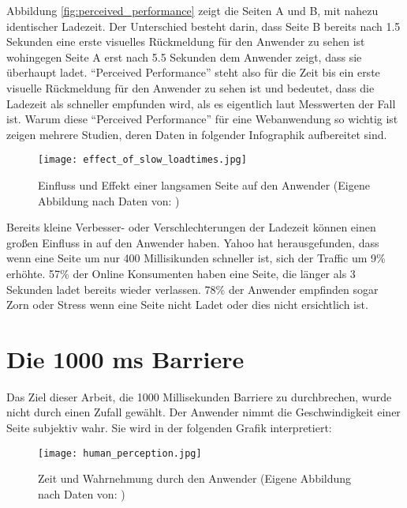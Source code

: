 		Abbildung \ref{fig:perceived_performance} zeigt die Seiten A und B, mit nahezu identischer Ladezeit. Der Unterschied besteht darin, dass Seite B bereits nach 1.5 Sekunden eine erste visuelles Rückmeldung für den Anwender zu sehen ist wohingegen Seite A erst nach 5.5 Sekunden dem Anwender zeigt, dass sie überhaupt ladet.
		"`Perceived Performance"' steht also für die Zeit bis ein erste visuelle Rückmeldung für den Anwender zu sehen ist und bedeutet, dass die Ladezeit als schneller empfunden wird, als es eigentlich laut Messwerten der Fall ist. Warum diese "`Perceived Performance"' für eine Webanwendung so wichtig ist zeigen mehrere Studien, deren Daten in folgender Infographik aufbereitet sind.

		\begin{figure}[htbp]
			\begin{center}
				\texttt{[image: effect\_of\_slow\_loadtimes.jpg]}
				\caption{Einfluss und Effekt einer langsamen Seite auf den Anwender (Eigene Abbildung nach Daten von: \autocite[p. 8]{radware14})}
				\label{fig:effect_of_slow_loadtimes}
			\end{center}
		\end{figure}

		Bereits kleine Verbesser- oder Verschlechterungen der Ladezeit können einen großen Einfluss in auf den Anwender haben. Yahoo hat herausgefunden, dass wenn eine Seite um nur 400 Millisikunden schneller ist, sich der Traffic um 9\% erhöhte.\autocite{stefanov08} 57\% der Online Konsumenten haben eine Seite, die länger als 3 Sekunden ladet bereits wieder verlassen. 78\% der Anwender empfinden sogar Zorn oder Stress wenn eine Seite nicht Ladet oder dies nicht ersichtlich ist.

	\pagebreak



\section{Die 1000 ms Barriere} %
\label{sec:die_1000_ms_barriere}
	Das Ziel dieser Arbeit, die 1000 Millisekunden Barriere zu durchbrechen, wurde nicht durch einen Zufall gewählt. Der Anwender nimmt die Geschwindigkeit einer Seite subjektiv wahr. Sie wird in der folgenden Grafik interpretiert:

	\begin{figure}[htbp]
		\begin{center}
			\texttt{[image: human\_perception.jpg]}
			\caption{Zeit und Wahrnehmung durch den Anwender (Eigene Abbildung nach Daten von: \autocite{grigorikHumanPerception})}
			\label{fig:human_perception}
		\end{center}
	\end{figure}

